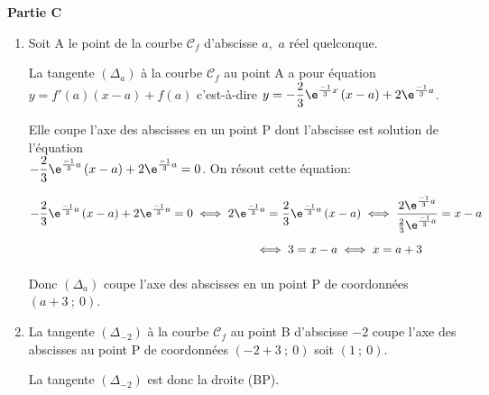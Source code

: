 \textbf{Partie C}

\medskip

\begin{enumerate}

\item Soit A le point de la courbe $\mathcal{C}_f$ d'abscisse $a$,\, $a$ réel quelconque.

La tangente $\left(\Delta_a\right)$ à la courbe $\mathcal{C}_f$ au point A a pour équation
$y=f'(a) \left (x-a\right )+f(a)$ c'est-à-dire 
$y=-\dfrac{2}{3}\e^{\frac{-1}{3}x}\left (x-a\right )+2\e^{\frac{-1}{3}a}$.

Elle coupe l'axe des abscisses en un point P dont l'abscisse est solution de l'équation \\
$-\dfrac{2}{3}\e^{\frac{-1}{3}a}\left (x-a\right )+2\e^{\frac{-1}{3}a} = 0$.
On résout cette équation:

$\begin{gathered}-\dfrac{2}{3}\e^{\frac{-1}{3}a}\left (x-a\right )+2\e^{\frac{-1}{3}a} = 0
\iff  2\e^{\frac{-1}{3}a} = \dfrac{2}{3}\e^{\frac{-1}{3}a}\left (x-a\right )
\iff \dfrac{2\e^{\frac{-1}{3}a}}{\frac{2}{3}\e^{\frac{-1}{3}a}}=x-a\\
\phantom{-\dfrac{2}{3}\e^{\frac{-1}{3}a}\left (x-a\right )+2\e^{\frac{-1}{3}a} = 0}
\iff 3 = x-a \iff x=a+3\end{gathered}$

Donc $\left(\Delta_a\right)$ coupe l'axe des abscisses en un point P de coordonnées $(a + 3~;~0)$.

\item La tangente $\left(\Delta_{-2}\right)$  à la courbe $\mathcal{C}_f$ au point B d'abscisse $- 2$ coupe l'axe des abscisses au point P de coordonnées $(-2+3~;~0)$ soit $(1~;~0)$.

La tangente $\left(\Delta_{-2}\right)$ est donc la droite (BP).
\end{enumerate}
